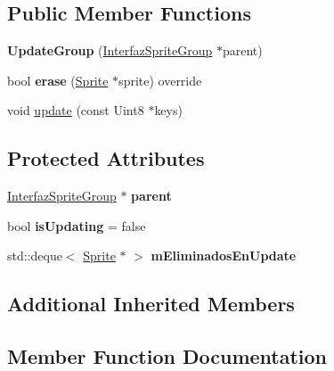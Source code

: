 \subsection*{Public Member Functions}
\begin{DoxyCompactItemize}
\item 
{\bfseries Update\+Group} (\hyperlink{class_interfaz_sprite_group}{Interfaz\+Sprite\+Group} $\ast$parent)\hypertarget{class_update_group_a49faf1743d86291fc62af018395db808}{}\label{class_update_group_a49faf1743d86291fc62af018395db808}

\item 
bool {\bfseries erase} (\hyperlink{class_sprite}{Sprite} $\ast$sprite) override\hypertarget{class_update_group_ac9f22f301968b34c662a90cd6072f1bf}{}\label{class_update_group_ac9f22f301968b34c662a90cd6072f1bf}

\item 
void \hyperlink{class_update_group_aaa43bd14b878a2caacd6be9baf5031ea}{update} (const Uint8 $\ast$keys)
\end{DoxyCompactItemize}
\subsection*{Protected Attributes}
\begin{DoxyCompactItemize}
\item 
\hyperlink{class_interfaz_sprite_group}{Interfaz\+Sprite\+Group} $\ast$ {\bfseries parent}\hypertarget{class_update_group_a37ce84487a403e7c7a4781a79fe36f85}{}\label{class_update_group_a37ce84487a403e7c7a4781a79fe36f85}

\item 
bool {\bfseries is\+Updating} = false\hypertarget{class_update_group_a5b2713caad73eff93b155d8e7ffb3a8a}{}\label{class_update_group_a5b2713caad73eff93b155d8e7ffb3a8a}

\item 
std\+::deque$<$ \hyperlink{class_sprite}{Sprite} $\ast$ $>$ {\bfseries m\+Eliminados\+En\+Update}\hypertarget{class_update_group_ab4434946aaa26d6ad6bed977af054ce6}{}\label{class_update_group_ab4434946aaa26d6ad6bed977af054ce6}

\end{DoxyCompactItemize}
\subsection*{Additional Inherited Members}


\subsection{Member Function Documentation}
